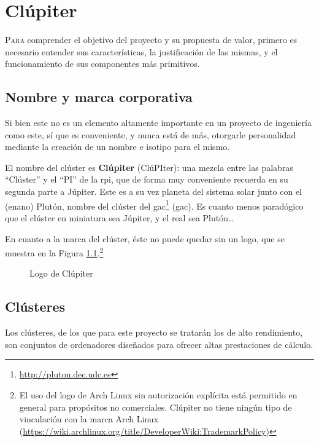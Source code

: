 \chapter{Clúpiter}
\label{chap:conceptos_basicos}

\lettrine{P}{ara} comprender el objetivo del proyecto y su propuesta de valor, primero es necesario entender sus características, la justificación de las mismas, y el funcionamiento de sus componentes más primitivos.

\section{Nombre y marca corporativa}
Si bien este no es un elemento altamente importante en un proyecto de ingeniería como este, sí que es conveniente, y nunca está de más, otorgarle personalidad mediante la creación de un nombre e isotipo para el mismo.

El nombre del clúster es \textbf{Clúpiter} (ClúPIter): una mezcla entre las palabras ``Clúster'' y el ``PI'' de la \acrlong{rpi}, que de forma muy conveniente recuerda en su segunda parte a Júpiter. Este es a su vez planeta del sistema solar junto con el (enano) Plutón, nombre del clúster del \acrshort{gac}\footnote{\url{http://pluton.dec.udc.es}} (\acrlong{gac}). Es cuanto menos paradógico que el clúster en miniatura sea Júpiter, y el real sea Plutón\dots

En cuanto a la marca del clúster, éste no puede quedar sin un logo, que se muestra en la Figura \ref{fig:clupiter_logo}.\footnote{El uso del logo de Arch Linux sin autorización explícita está permitido en general para propósitos no comerciales. Clúpiter no tiene ningún tipo de vinculación con la marca Arch Linux (\url{https://wiki.archlinux.org/title/DeveloperWiki:TrademarkPolicy})}

\begin{figure}[h!]
  \centering
  \vspace*{0.5cm}
  \def\svgwidth{0.50\textwidth}
  
  \caption{Logo de Clúpiter}
  \label{fig:clupiter_logo}
\end{figure}

\section{Clústeres}
Los clústeres, de los que para este proyecto se tratarán los de alto rendimiento, son conjuntos de ordenadores diseñados para ofrecer altas prestaciones de cálculo.

